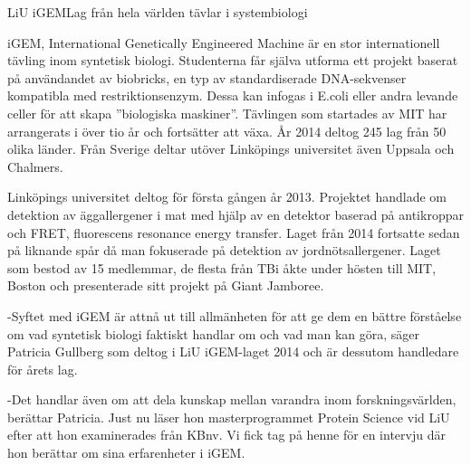 \begin{news}{2}{LiU iGEM}{Lag från hela världen tävlar i systembiologi}{}{}

iGEM, International Genetically Engineered Machine är en stor
internationell tävling inom syntetisk biologi. Studenterna får själva
utforma ett projekt baserat på användandet av biobricks, en typ av
standardiserade DNA-sekvenser kompatibla med restriktionsenzym. Dessa
kan infogas i E.coli eller andra levande celler för att skapa
”biologiska maskiner”. Tävlingen som startades av MIT har arrangerats
i över tio år och fortsätter att växa. År 2014 deltog 245 lag från 50
olika länder. Från Sverige deltar utöver Linköpings universitet även
Uppsala och Chalmers.





Linköpings universitet deltog för första gången år 2013. Projektet
handlade om detektion av äggallergener i mat med hjälp av en detektor
baserad på antikroppar och FRET, fluorescens resonance energy
transfer. Laget från 2014 fortsatte sedan på liknande spår då man
fokuserade på detektion av jordnötsallergener. Laget som bestod av 15
medlemmar, de flesta från TBi åkte under hösten till MIT, Boston och
presenterade sitt projekt på Giant Jamboree.

-Syftet med iGEM är attnå ut till allmänheten för att ge dem en bättre 
förståelse om vad syntetisk biologi faktiskt handlar om och vad man kan göra, 
säger Patricia Gullberg som deltog i LiU iGEM-laget 2014 och är dessutom 
handledare för årets lag.  

-Det handlar även om att dela kunskap mellan varandra inom forskningsvärlden, 
berättar Patricia. Just nu läser hon masterprogrammet Protein Science vid LiU 
efter att hon examinerades från KBnv. Vi fick tag på henne för en intervju 
där hon berättar om sina erfarenheter i iGEM.
\end {news}


